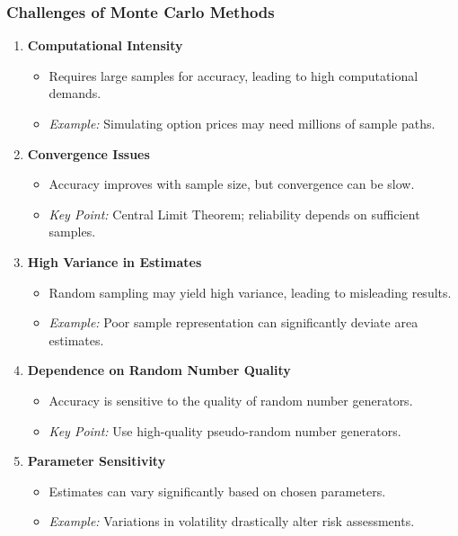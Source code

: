 \documentclass[aspectratio=169]{beamer}
\begin{document}
\begin{frame}[fragile]
    \frametitle{Challenges of Monte Carlo Methods}
    \begin{enumerate}
        \item \textbf{Computational Intensity}
            \begin{itemize}
                \item Requires large samples for accuracy, leading to high computational demands.
                \item \emph{Example:} Simulating option prices may need millions of sample paths.
            \end{itemize}
        \item \textbf{Convergence Issues}
            \begin{itemize}
                \item Accuracy improves with sample size, but convergence can be slow.
                \item \emph{Key Point:} Central Limit Theorem; reliability depends on sufficient samples.
            \end{itemize}
        \item \textbf{High Variance in Estimates}
            \begin{itemize}
                \item Random sampling may yield high variance, leading to misleading results.
                \item \emph{Example:} Poor sample representation can significantly deviate area estimates.
            \end{itemize}
        \item \textbf{Dependence on Random Number Quality}
            \begin{itemize}
                \item Accuracy is sensitive to the quality of random number generators.
                \item \emph{Key Point:} Use high-quality pseudo-random number generators.
            \end{itemize}
        \item \textbf{Parameter Sensitivity}
            \begin{itemize}
                \item Estimates can vary significantly based on chosen parameters.
                \item \emph{Example:} Variations in volatility drastically alter risk assessments.
            \end{itemize}
    \end{enumerate}
\end{frame}
\end{document}
